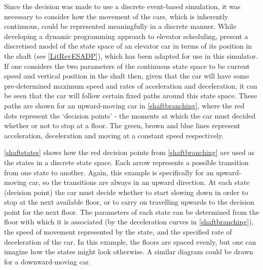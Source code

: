 \documentclass{UoYCSproject}
\begin{document}
\begin{figure} [h]
\begin{minipage}[t]{.46\textwidth}
		\label{shaftstates}
	\end{minipage}
\end{figure}

Since the decision was made to use a discrete event-based simulation, it was necessary to consider how the movement of the cars, which is inherently continuous, could be represented meaningfully in a discrete manner.  While developing a dynamic programming approach to elevator scheduling, \citet{Nikovski2003} present a discretised model of the state space of an elevator car in terms of its position in the shaft (see \autoref{LitRevESADP}), which has been adapted for use in this simulator.  If one considers the two parameters of the continuous state space to be current speed and vertical position in the shaft then, given that the car will have some pre-determined maximum speed and rates of acceleration and deceleration, it can be seen that the car will follow certain fixed paths around this state space.  These paths are shown for an upward-moving car in \autoref{shaftbranching}, where the red dots represent the `decision points' - the moments at which the car must decided whether or not to stop at a floor.  The green, brown and blue lines represent acceleration, deceleration and moving at a constant speed respectively.

\autoref{shaftstates} shows how the red decision points from \autoref{shaftbranching} are used as the states in a discrete state space.  Each arrow represents a possible transition from one state to another.  Again, this example is specifically for an upward-moving car, so the transitions are always in an upward direction.  At each state (decision point) the car must decide whether to start slowing down in order to stop at the next available floor, or to carry on travelling upwards to the decision point for the next floor.  The parameters of each state can be determined from the floor with which it is associated (by the deceleration curves in \autoref{shaftbranching}), the speed of movement represented by the state, and the specified rate of deceleration of the car.  In this example, the floors are spaced evenly, but one can imagine how the states might look otherwise.  A similar diagram could be drawn for a downward-moving car.
\end{document}
